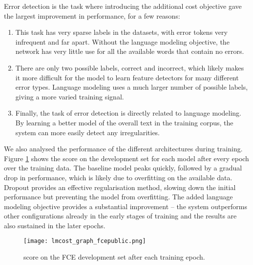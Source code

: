 \documentclass[11pt,a4paper]{article}
\begin{document}
Error detection is the task where introducing the additional cost objective gave the largest improvement in performance, for a few reasons:

\begin{enumerate}
\item This task has very sparse labels in the datasets, with error tokens very infrequent and far apart. Without the language modeling objective, the network has very little use for all the available words that contain no errors.
\item There are only two possible labels, correct and incorrect, which likely makes it more difficult for the model to learn feature detectors for many different error types. Language modeling uses a much larger number of possible labels, giving a more varied training signal.
\item Finally, the task of error detection is directly related to language modeling. By learning a better model of the overall text in the training corpus, the system can more easily detect any irregularities.
\end{enumerate}



We also analysed the performance of the different architectures during training.
Figure \ref{fig:graph_fcepublic} shows the  score on the development set for each model after every epoch over the training data.
The baseline model peaks quickly, followed by a gradual drop in performance, which is likely due to overfitting on the available data.
Dropout provides an effective regularisation method, slowing down the initial performance but preventing the model from overfitting.
The added language modeling objective provides a substantial improvement -- the system outperforms other configurations already in the early stages of training and the results are also sustained in the later epochs.





\begin{figure}[h]
	\texttt{[image: lmcost\_graph\_fcepublic.png]}
	\caption{ score on the FCE development set after each training epoch.}
	\label{fig:graph_fcepublic}
\end{figure}
\end{document}
